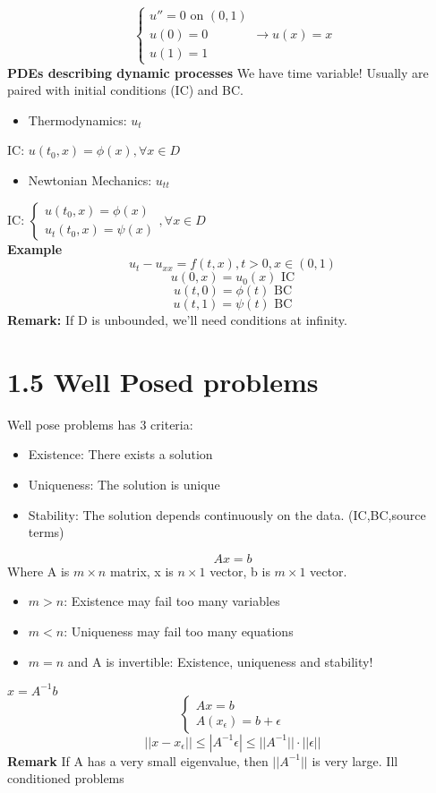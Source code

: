 \documentclass{article}
\begin{document}
$$\begin{cases}
    u'' = 0 \text{ on } (0,1)\\
    u(0) = 0\\
    u(1) = 1
\end{cases} \rightarrow u(x) = x$$
\textbf{PDEs describing dynamic processes}
We have time variable! Usually are paired with initial conditions (IC) and BC.\\
\begin{itemize}
    \item Thermodynamics: $u_t$
\end{itemize}
IC: $u(t_0, x) = \phi(x) , \forall x \in D$\\
\begin{itemize}
    \item Newtonian Mechanics: $u_{tt}$
\end{itemize}
IC: $\begin{cases}
    u(t_0, x) = \phi(x)\\
    u_t(t_0, x) = \psi(x)
\end{cases}, \forall x \in D$\\
\textbf{Example}\\
$$ u_t - u_{xx} = f(t,x), t > 0, x \in (0,1)$$
$$u(0,x) = u_0(x) \text{ IC}$$
$$u(t,0) = \phi(t) \text{ BC}$$
$$u(t,1) = \psi(t) \text{ BC}$$
\textbf{Remark: } If D is unbounded, we'll need conditions at infinity.\\
\section*{1.5 Well Posed problems}
Well pose problems has 3 criteria:
\begin{itemize}
    \item Existence: There exists a solution
    \item Uniqueness: The solution is unique
    \item Stability: The solution depends continuously on the data. (IC,BC,source terms)
\end{itemize}
$$A x = b$$
Where A is $m \times n$ matrix, x is $n \times 1$ vector, b is $m \times 1$ vector.\\
\begin{itemize}
    \item $m > n$: Existence may fail too many variables
    \item $m < n$: Uniqueness may fail too many equations
    \item $m = n$ and A is invertible: Existence, uniqueness and stability! 
\end{itemize}
$x = A^{-1}b$\\
$$ \begin{cases}
    Ax = b \\
    A(x_\epsilon) = b + \epsilon
\end{cases}$$
$$||x - x_\epsilon|| \leq |A^{-1} \epsilon| \leq ||A^{-1}|| \cdot ||\epsilon||$$
\textbf{Remark} If A has a very small eigenvalue, then $||A^{-1}||$ is very large. Ill conditioned problems\\
\end{document}
